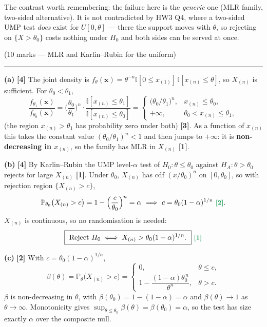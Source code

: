 \documentclass[11pt]{article}
\newcommand{\Prob}{\mathbb{P}}
\newcommand{\I}{\mathbb{I}}
\newcommand{\mk}[1]{{\small\color{ForestGreen}\textbf{[#1]}}}
\newcommand{\qhead}[2]{\bigskip\noindent{\large\bfseries Question #1}\quad\textnormal{\small(#2)}\par
  \vspace{2pt}\hrule\vspace{6pt}}
\begin{document}
\begin{trapbox}
The contrast worth remembering: the failure here is the \emph{generic} one (MLR family,
two-sided alternative). It is not contradicted by HW3 Q4, where a two-sided UMP test
\emph{does} exist for $U[0,\theta]$ --- there the support moves with $\theta$, so rejecting on
$\{X>\theta_0\}$ costs nothing under $H_0$ and both sides can be served at once.
\end{trapbox}

\qhead{8}{10 marks --- MLR and Karlin--Rubin for the uniform}

\noindent\textbf{(a)} \mk{4}
The joint density is $f_\theta(\mathbf x)=\theta^{-n}\I[0\le x_{(1)}]\,\I[x_{(n)}\le\theta]$,
so $X_{(n)}$ is sufficient. For $\theta_0<\theta_1$,
\[
\frac{f_{\theta_1}(\mathbf x)}{f_{\theta_0}(\mathbf x)}
=\Big(\frac{\theta_0}{\theta_1}\Big)^{n}\cdot
\frac{\I[x_{(n)}\le\theta_1]}{\I[x_{(n)}\le\theta_0]}
=\begin{cases}
\big(\theta_0/\theta_1\big)^{n}, & x_{(n)}\le\theta_0,\\[3pt]
+\infty, & \theta_0<x_{(n)}\le\theta_1,
\end{cases}
\]
(the region $x_{(n)}>\theta_1$ has probability zero under both) \mk{3}. As a function of
$x_{(n)}$ this takes the constant value $(\theta_0/\theta_1)^{n}<1$ and then jumps to
$+\infty$: it is \textbf{non-decreasing in $x_{(n)}$}, so the family has MLR in $X_{(n)}$
\mk{1}.

\smallskip\noindent\textbf{(b)} \mk{4}
By Karlin--Rubin the UMP level-$\alpha$ test of $H_0:\theta\le\theta_0$ against
$H_A:\theta>\theta_0$ rejects for large $X_{(n)}$ \mk{1}. Under $\theta_0$, $X_{(n)}$ has cdf
$(x/\theta_0)^{n}$ on $[0,\theta_0]$, so with rejection region $\{X_{(n)}>c\}$,
\[
\Prob_{\theta_0}\big(X_{(n)}>c\big)=1-\Big(\frac{c}{\theta_0}\Big)^{n}=\alpha
\ \Longrightarrow\ c=\theta_0(1-\alpha)^{1/n}\ \mk{2}.
\]
$X_{(n)}$ is continuous, so no randomisation is needed:
\[
\boxed{\ \text{Reject }H_0\iff X_{(n)}>\theta_0(1-\alpha)^{1/n}.\ }\ \mk{1}
\]

\smallskip\noindent\textbf{(c)} \mk{2}
With $c=\theta_0(1-\alpha)^{1/n}$,
\[
\beta(\theta)=\Prob_\theta\big(X_{(n)}>c\big)=
\begin{cases}
0, & \theta\le c,\\[3pt]
1-\dfrac{(1-\alpha)\theta_0^{\,n}}{\theta^{n}}, & \theta>c .
\end{cases}
\]
$\beta$ is non-decreasing in $\theta$, with $\beta(\theta_0)=1-(1-\alpha)=\alpha$ and
$\beta(\theta)\to1$ as $\theta\to\infty$. Monotonicity gives
$\sup_{\theta\le\theta_0}\beta(\theta)=\beta(\theta_0)=\alpha$, so the test has size exactly
$\alpha$ over the composite null.
\end{document}
